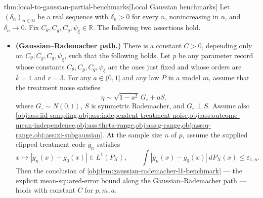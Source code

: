 \documentclass[11pt]{article}
\begin{document}
\begin{theoremv}{thm:local-to-gaussian-partial-benchmarks}[Local Gaussian benchmarks]
Let \((\delta_n)_{n\in\mathbb N}\) be a real sequence with \(\delta_n>0\) for every \(n\), nonincreasing in \(n\), and \(\delta_n\to0\).  Fix \(C_{\theta},C_g,C_q,\psi_{\xi}\in\mathbb R\).  The following two assertions hold.

\begin{itemize}
\item \textbf{(Gaussian--Rademacher path.)} There is a constant \(C>0\), depending only on \(C_{\theta},C_g,C_q,\psi_{\xi}\), such that the following holds.  Let \(p\) be any parameter record whose constants \(C_{\theta},C_g,C_q,\psi_{\xi}\) are the ones just fixed and whose orders are \(k=4\) and \(r=3\).  For any \(a\in(0,1]\) and any law \(P\) in a model \(m\), assume that the treatment noise satisfies
\[
\eta\sim \sqrt{1-a^2}\,G_{\circ}+aS,
\]
where \(G_{\circ}\sim N(0,1)\), \(S\) is symmetric Rademacher, and \(G_{\circ}\perp S\).  Assume also \cref{obj:ass:iid-sampling,obj:ass:independent-treatment-noise,obj:ass:outcome-mean-independence,obj:ass:theta-range,obj:ass:g-range,obj:ass:q-range,obj:ass:xi-subgaussian}.  At the sample size \(n\) of \(p\), assume the supplied clipped treatment code \(\bar g_n\) satisfies
\[
x\mapsto |\bar g_n(x)-g_0(x)|\in L^1(P_X),
\qquad
\int |\bar g_n(x)-g_0(x)|\,dP_X(x)\le \varepsilon_{1,n}.
\]
Then the conclusion of \cref{obj:lem:gaussian-rademacher-l1-benchmark} — the explicit mean-squared-error bound along the Gaussian--Rademacher path — holds with constant \(C\) for \(p,m,a\).


\end{itemize}
\end{theoremv}
\end{document}

